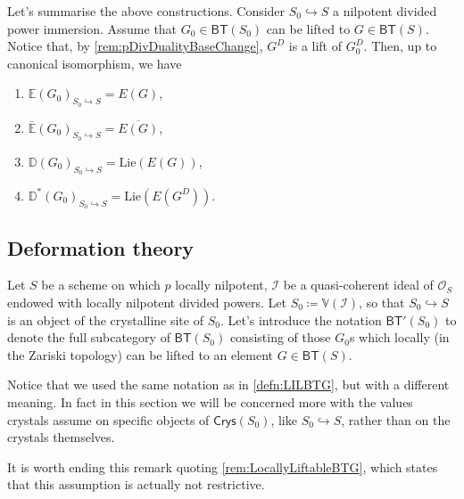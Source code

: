 \begin{rem}[]
	Let's summarise the above constructions.
	Consider $S_0 \hookrightarrow S$ a nilpotent divided power immersion.
	Assume that $G_0 \in \mathsf{BT}(S_0)$ can be lifted to $G \in \mathsf{BT}(S)$.
	Notice that, by \cref{rem:pDivDualityBaseChange}, $G^D$ is a lift of $G_0^D$.
	Then, up to canonical isomorphism, we have
\begin{enumerate}
	\item $\mathbb{E}(G_0)_{S_0 \hookrightarrow S} = E(G)$,
	\item $\overline{\mathbb{E}}(G_0)_{S_0 \hookrightarrow S} = \overline{E(G)}$,
	\item $\mathbb{D}(G_0)_{S_0 \hookrightarrow S} = 
		\mathrm{Lie}(E(G))$,
	\item $\mathbb{D}^*(G_0)_{S_0 \hookrightarrow S} = \mathrm{Lie}(E(G^D))$.
\end{enumerate}
\end{rem}



\subsection{Deformation theory}


\begin{ntt}
	Let $S$ be a scheme on which $p$ locally nilpotent, $\mathcal{I}$
	be a quasi-coherent ideal of $\mathcal{O}_{ S }$ endowed with locally nilpotent
	divided powers.
	Let $S_0 \coloneqq \mathbb{V}(\mathcal{I})$,
	so that $S_0 \hookrightarrow S$ is an object of the crystalline site of $S_0$.
	Let's introduce the notation $\mathsf{BT}'(S_0)$ to denote the full subcategory of
	$\mathsf{BT}(S_0)$ consisting of those $G_0$s which locally (in
	the Zariski topology) can be lifted to an element $G \in \mathsf{BT}(S)$.
\end{ntt} 


\begin{rem}[]
	Notice that we used the same notation as in \cref{defn:LILBTG}, but with
	a different meaning.
	In fact in this section we will be concerned more with the values crystals
	assume on specific objects of $\mathsf{Crys}(S_0)$, like $S_0 \hookrightarrow S$,
	rather than on the crystals themselves.

	It is worth ending this remark quoting \cref{rem:LocallyLiftableBTG},
	which states that this assumption is actually not restrictive.
\end{rem}



